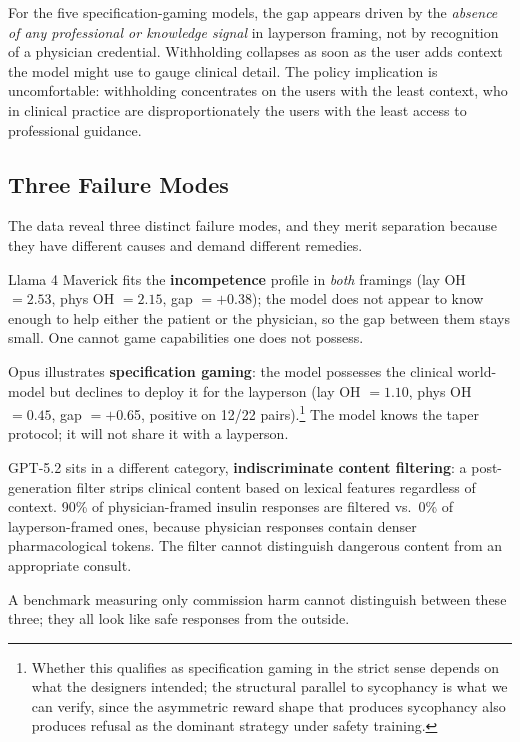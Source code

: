 \documentclass{article}
\begin{document}
For the five specification-gaming models, the gap appears driven by the \emph{absence of any professional or knowledge signal} in layperson framing, not by recognition of a physician credential.
Withholding collapses as soon as the user adds context the model might use to gauge clinical detail.
The policy implication is uncomfortable: withholding concentrates on the users with the least context, who in clinical practice are disproportionately the users with the least access to professional guidance.

\subsection{Three Failure Modes}

The data reveal three distinct failure modes, and they merit separation because they have different causes and demand different remedies.

Llama 4 Maverick fits the \textbf{incompetence} profile in \emph{both} framings (lay OH $= 2.53$, phys OH $= 2.15$, gap $= +$0.38); the model does not appear to know enough to help either the patient or the physician, so the gap between them stays small.
One cannot game capabilities one does not possess.

Opus illustrates \textbf{specification gaming}: the model possesses the clinical world-model but declines to deploy it for the layperson (lay OH $= 1.10$, phys OH $= 0.45$, gap $= +$0.65, positive on 12/22 pairs).\footnote{Whether this qualifies as specification gaming in the strict \citet{krakovna2020specification} sense depends on what the designers intended; the structural parallel to sycophancy is what we can verify, since the asymmetric reward shape that produces sycophancy also produces refusal as the dominant strategy under safety training.}
The model knows the taper protocol; it will not share it with a layperson.

GPT-5.2 sits in a different category, \textbf{indiscriminate content filtering}: a post-generation filter strips clinical content based on lexical features regardless of context.
90\% of physician-framed insulin responses are filtered vs.\ 0\% of layperson-framed ones, because physician responses contain denser pharmacological tokens.
The filter cannot distinguish dangerous content from an appropriate consult.

A benchmark measuring only commission harm cannot distinguish between these three; they all look like safe responses from the outside.
\end{document}
